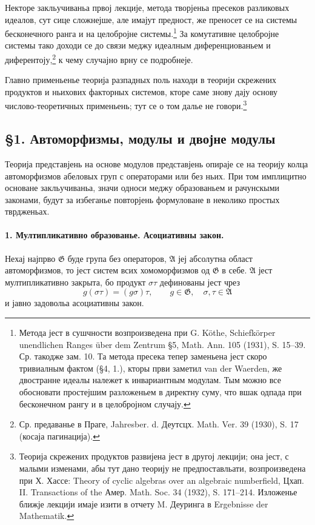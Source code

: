 ﻿\documentclass[11pt]{article}
\newcommand{\foreign}[1]{#1}
\providecommand{\frA}{\mathfrak A}
\providecommand{\frG}{\mathfrak G}
\begin{document}
Некторе закльучиваньа првој лекције, метода творјеньа пресеков разликовых идеалов, сут сице сложнејше, але имајут предност, же преносет се на системы бесконечного ранга и на целобројне системы.\footnote{Метода јест в сушчности возпроизведена при G. Köthe, \foreign{Schiefkörper unendlichen Ranges über dem Zentrum} §5, Math. Ann. 105 (1931), S. 15--39. Ср. такодже зам. 10. Та метода пресека тепер заменьена јест скоро тривиалным фактом (§4, 1.), кторы први заметил van der Waerden, же двостранне идеалы належет к инвариантным модулам. Тым можно все обосновати простејшим разложеньем в директну суму, что вшак одпада при бесконечном рангу и в целобројном случају.} За комутативне целобројне системы тако доходи се до связи меджу идеалным диференциованьем и диферентоју,\footnote{Ср. предаванье в Праге, Jahresber. d. Деутсцх. Math. Ver. 39 (1930), S. 17 (косаја пагинација).} к чему случајно врну се подробнеје.

Главно применьенье теорија разпадных поль находи в теорији скрежених продуктов и ньихових факторных системов, кторе саме знову дају основу числово-теоретичных применьень; тут се о том далье не говори.\footnote{Теорија скрежених продуктов развијена јест в другој лекцији; она јест, с малыми изменами, абы тут дано теорију не предпоставльати, возпроизведена при Х. Хассе: \foreign{Theory of cyclic algebras over an algebraic numberfield}, Цхап. II. Transactions of the Амер. Math. Soc. 34 (1932), S. 171--214. Изложенье ближје лекцији имаје изити в отчету M. Деуринга в \foreign{Ergebnisse der Mathematik}.}

\subsection*{§1. Автоморфизмы, модулы и двојне модулы}

Теорија представјень на основе модулов представјень опираје се на теорију колца автоморфизмов абеловых груп с операторами или без ньих. При том имплицитно основане закльучиваньа, значи односи меджу образованьем и рачунскыми законами, будут за избеганье повторјень формуловане в неколико простых тврдженьах.

\paragraph{1. Мултипликативно образованье. Асоциативны закон.}
Нехај најпрво \(\frG\) буде група без операторов, \(\frA\) јеј абсолутна област автоморфизмов, то јест систем всих хомоморфизмов од \(\frG\) в себе. \(\frA\) јест мултипликативно закрыта, бо продукт \( \sigma\tau \) дефинованы јест чрез
\[
        g(\sigma\tau)=(g\sigma)\tau,
        \qquad g\in\frG,\quad \sigma,\tau\in\frA                         \tag{1}
\]
и јавно задовольа асоциативны закон.
\end{document}
